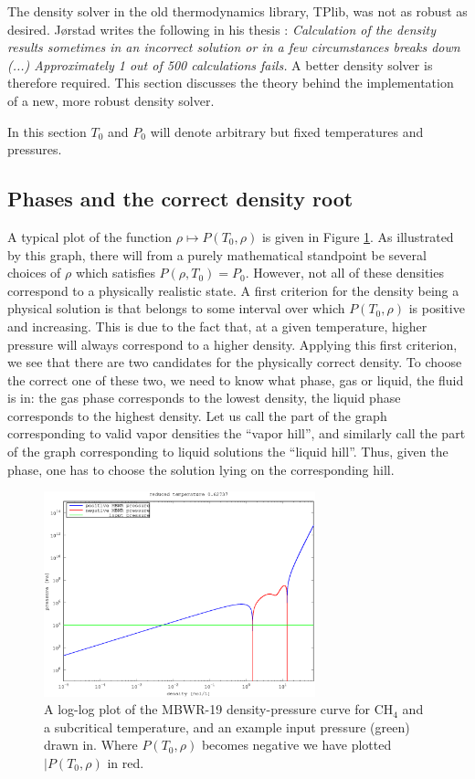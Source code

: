 \documentclass[english]{../thermomemo/thermomemo}
\numberwithin{equation}{section}
\begin{document}
The density solver in the old thermodynamics library, TPlib, was not as robust as
desired. Jørstad writes the following in his thesis \cite{Jorstad93}:
\textit{Calculation of the density results sometimes in an incorrect
  solution or in a few circumstances breaks down (...) Approximately 1
  out of 500 calculations fails.} A better density solver is therefore
required. This section discusses the theory behind the implementation
of a new, more robust density solver.

In this section $T_0$ and $P_0$ will denote arbitrary but fixed
temperatures and pressures.

\subsection{Phases and the correct density root} %
A typical plot of the function $\rho \mapsto P(T_0,\rho)$ is given in
Figure \ref{fig:p_ill}. As illustrated by this graph, there will
from a purely mathematical standpoint be several choices of $\rho$
which satisfies $P(\rho,T_0) = P_0$. However, not all of these
densities correspond to a physically realistic state. A first
criterion for the density being a physical solution is that belongs to
some interval over which $P(T_0,\rho)$ is positive and
increasing. This is due to the fact that, at a given temperature,
higher pressure will always correspond to a higher density. Applying
this first criterion, we see that there are two candidates for the
physically correct density. To choose the correct one of these two, we
need to know what phase, gas or liquid, the fluid is in: the gas phase
corresponds to the lowest density, the liquid phase corresponds to the
highest density. Let us call the part of the graph corresponding to
valid vapor densities the ``vapor hill'', and similarly call the part of the
graph corresponding to liquid solutions the ``liquid hill''. Thus,
given the phase, one has to choose the solution lying on the
corresponding hill.

\begin{figure}[h]
  \centering
  \includegraphics[width=0.7\textwidth]{figures/pressureIllustration.eps}
  \caption{A log-log plot of the MBWR-19 density-pressure curve for CH$_4$ and a
    subcritical temperature, and an example input pressure (green) drawn
    in. Where $P(T_0,\rho)$ becomes negative we have plotted
    $|P(T_0,\rho)$ in red.}
  \label{fig:p_ill}
\end{figure}
\end{document}
